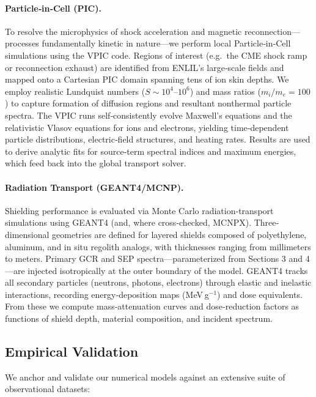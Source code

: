 \documentclass[12pt]{report}
\begin{document}
\paragraph{Particle‐in‐Cell (PIC).}  
To resolve the microphysics of shock acceleration and magnetic reconnection—processes fundamentally kinetic in nature—we perform local Particle‐in‐Cell simulations using the VPIC code.  Regions of interest (e.g.\ the CME shock ramp or reconnection exhaust) are identified from ENLIL’s large‐scale fields and mapped onto a Cartesian PIC domain spanning tens of ion skin depths.  We employ realistic Lundquist numbers ($S\sim10^4$–$10^6$) and mass ratios ($m_i/m_e=100$) to capture formation of diffusion regions and resultant nonthermal particle spectra.  The VPIC runs self‐consistently evolve Maxwell’s equations and the relativistic Vlasov equations for ions and electrons, yielding time‐dependent particle distributions, electric‐field structures, and heating rates.  Results are used to derive analytic fits for source‐term spectral indices and maximum energies, which feed back into the global transport solver.

\paragraph{Radiation Transport (GEANT4/MCNP).}  
Shielding performance is evaluated via Monte Carlo radiation‐transport simulations using GEANT4 (and, where cross‐checked, MCNPX).  Three‐dimensional geometries are defined for layered shields composed of polyethylene, aluminum, and in situ regolith analogs, with thicknesses ranging from millimeters to meters.  Primary GCR and SEP spectra—parameterized from Sections 3 and 4—are injected isotropically at the outer boundary of the model.  GEANT4 tracks all secondary particles (neutrons, photons, electrons) through elastic and inelastic interactions, recording energy‐deposition maps (MeV g$^{-1}$) and dose equivalents.  From these we compute mass‐attenuation curves and dose‐reduction factors as functions of shield depth, material composition, and incident spectrum. 

\subsection{Empirical Validation}

We anchor and validate our numerical models against an extensive suite of observational datasets:
\end{document}
